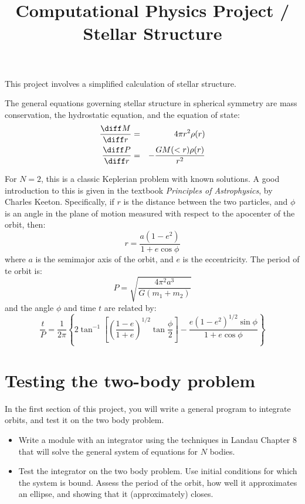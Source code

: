 \documentclass[11pt, preprint]{aastex}
\begin{document}
\title{\bf Computational Physics Project / Stellar Structure}

This project involves a simplified calculation of stellar structure.

The general equations governing stellar structure in spherical
symmetry are mass conservation, the hydrostatic equation, and the
equation of state:
\begin{eqnarray}
\frac{\diff M}{\diff r} &=& 4\pi r^2 \rho(r) \cr
\frac{\diff P}{\diff r} &=& - \frac{G M(<r)\rho(r)}{r^2}
\end{eqnarray}

For $N=2$, this is a classic Keplerian problem with known solutions.
A good introduction to this is given in the textbook {\it Principles
  of Astrophysics}, by Charles Keeton. Specifically, if $r$ is the
distance between the two particles, and $\phi$ is an angle in the
plane of motion measured with respect to the apocenter of the orbit,
then:
\begin{equation}
r = \frac{a(1-e^2)}{1+e \cos\phi}
\end{equation}
where $a$ is the semimajor axis of the orbit, and $e$ is the
eccentricity. The period of te orbit is:
\begin{equation}
P = \sqrt{\frac{4\pi^2 a^3}{G(m_1 + m_2)}}
\end{equation}
and the angle $\phi$ and time $t$ are related by:
\begin{equation}
  \frac{t}{P} = \frac{1}{2\pi}\left\{
    2\tan^{-1}\left[\left(\frac{1-e}{1+e}\right)^{1/2}
      \tan\frac{\phi}{2}\right]
    - \frac{e(1-e^2)^{1/2} \sin\phi}{1+e\cos\phi}\right\}
\end{equation}

\section{Testing the two-body problem}

In the first section of this project, you will write a general program
to integrate orbits, and test it on the two body problem.

\begin{itemize}
\item Write a module with an integrator using the techniques in Landau
  Chapter 8 that will solve the general system of equations for $N$
  bodies.
\item Test the integrator on the two body problem. Use initial
  conditions for which the system is bound. Assess the period of the
  orbit, how well it approximates an ellipse, and showing that it
  (approximately) closes.
\end{itemize}
\end{document}
